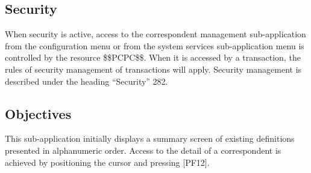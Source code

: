 \documentclass[letterpaper,10pt,english]{sphinxmanual}
\begin{document}
\ignorespaces 

\subsection{Security}
\label{\detokenize{audit_operations_ and_performance:security}}\label{\detokenize{audit_operations_ and_performance:index-49}}
When security is active, access to the correspondent management sub-application from the configuration menu or
from the system services sub-application menu is controlled by the resource \$\$PCPC\$\$.
When it is accessed by a transaction, the rules of security management of transactions will apply.
Security management is described under the heading “Security” 282.

\ignorespaces 

\subsection{Objectives}
\label{\detokenize{audit_operations_ and_performance:objectives}}\label{\detokenize{audit_operations_ and_performance:index-50}}
This sub-application initially displays a summary screen of existing definitions presented in alphanumeric order. Access
to the detail of a correspondent is achieved by positioning the cursor and pressing {[}PF12{]}.



\end{document}
